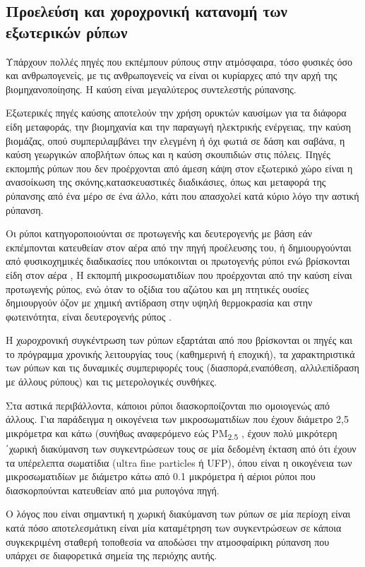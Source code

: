 \subsection{Προελεύση και χοροχρονική κατανομή των εξωτερικών ρύπων}
Υπάρχουν πολλές πηγές που εκπέμπουν ρύπους στην ατμόσφαιρα, τόσο φυσικές όσο και ανθρωπογενείς, με τις ανθρωπογενείς να είναι οι κυρίαρχες από την αρχή της βιομηχανοποίησης. Η καύση είναι μεγαλύτερος συντελεστής ρύπανσης. 

Εξωτερικές πηγές καύσης αποτελούν την χρήση ορυκτών καυσίμων για  τα διάφορα είδη μεταφοράς, την βιομηχανία και την παραγωγή ηλεκτρικής ενέργειας, την καύση βιομάζας, οπού συμπεριλαμβάνει την ελεγμένη ή όχι φωτιά σε δάση και σαβάνα, η καύση γεωργικών αποβλήτων όπως και η καύση σκουπιδιών στις πόλεις. Πηγές εκπομπής ρύπων που δεν προέρχονται από άμεση κάψη στον εξωτερικό χώρο είναι η ανασοίκωση της σκόνης,κατασκευαστικές διαδικάσιες, όπως και μεταφορά της ρύπανσης από ένα μέρο σε ένα άλλο, κάτι που απασχολεί κατά κύριο λόγο την αστική ρύπανση.

Οι ρύποι  κατηγοροποιούνται σε προτωγενής και δευτερογενής με βάση εάν εκπέμπονται κατευθείαν στον αέρα από την πηγή προέλευσης του, ή δημιουργούνται από φυσικοχημικές διαδικασίες που υπόκοινται οι πρωτογενής ρύποι ενώ βρίσκονται είδη στον αέρα , Η εκπομπή μικροσωματιδίων που προέρχονται από την καύση είναι προτωγενής ρύπος, ενώ όταν το οξίδια του αζώτου και μη πτητικές ουσίες δημιουργούν όζον με χημική αντίδραση στην υψηλή θερμοκρασία και στην φωτεινότητα, είναι δευτερογενής ρύπος \cite{EPA-GROUND-OZONE}.


Η χωροχρονική συγκέντρωση των ρύπων εξαρτάται από που βρίσκονται οι πηγές και το πρόγραμμα χρονικής λειτουργίας τους (καθημερινή ή εποχική), τα χαρακτηριστικά των ρύπων και τις δυναμικές συμπεριφορές τους (διασπορά,εναπόθεση, αλλιλεπίδραση με άλλους ρύπους) και τις μετερολογικές συνθήκες.

Στα αστικά περιβάλλοντα, κάποιοι ρύποι διασκορποίζονται πιο ομοιογενώς από άλλους. Για παράδειγμα η οικογένεια των μικροσωματιδίων που έχουν διάμετρο 2,5 μικρόμετρα και κάτω (συνήθως αναφερόμενο εώς PM\textsubscript{2.5} , 
έχουν πολύ μικρότερη ΄χωρική διακύμανση των συγκεντρώσεων τους σε μία δεδομένη έκταση από ότι έχουν τα υπέρελεπτα σωματίδια (ultra fine particles ή UFP), όπου είναι η οικογένεια των μικροσωματιδίων με διάμετρο κάτω από 0.1 μικρόμετρα ή  αέριοι ρύποι που διασκορπούνται κατευθείαν από μια ρυπογόνα πηγή.



Ο λόγος που είναι σημαντική η χωρική διακύμανση των ρύπων σε μία περίοχη είναι κατά πόσο αποτελεσμάτικη είναι μία καταμέτρηση των συγκεντρώσεων σε κάποια συγκεκριμένη σταθερή τοποθεσία να αποδώσει την ατμοσφαίρικη ρύπανση που υπάρχει σε διαφορετικά σημεία της περιόχης αυτής. 

